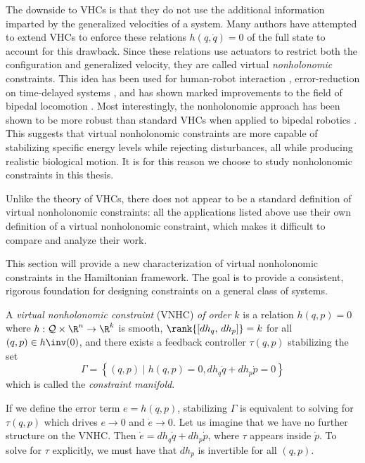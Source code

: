 The downside to VHCs is that they do not use the additional information imparted
by the generalized velocities of a system.
Many authors have attempted to extend VHCs to enforce these relations 
\(h(q,\dot{q}) = 0\) of the full state to account for this drawback. 
Since these relations use actuators to
restrict both the configuration and generalized velocity, they are called
virtual \textit{nonholonomic} constraints. This idea has been used for
human-robot interaction
\cite{vnhc_human_robot_cooperation,psd_based_vnhc_redundant_manipulator,haptic_vnhc},
error-reduction on time-delayed systems \cite{vnhc_time_delay_teleop},
and has shown marked improvements to the field of bipedal locomotion 
\cite{nhvc_dynamic_walking,
hybrid_zero_dynamics_bipedal_nhvcs,output_nhvc_bipedal_control}.
Most interestingly, the nonholonomic approach has been shown to be more robust
than standard VHCs when applied to bipedal robotics \cite{nhvc_incline_walking}.
This suggests that virtual nonholonomic constraints are more capable of
stabilizing specific energy levels while rejecting disturbances, all while
producing realistic biological motion. It is for this reason we choose to study
nonholonomic constraints in this thesis.

Unlike the theory of VHCs, there does not appear to be a standard definition of
virtual nonholonomic constraints: 
all the applications listed above use their own definition of a virtual
nonholonomic constraint, which makes it difficult to compare and analyze their
work. 

This section will provide a new characterization of virtual nonholonomic
constraints in the Hamiltonian framework. 
The goal is to provide a consistent, rigorous foundation for
designing constraints on a general class of systems.

\begin{defn}
    A \textit{virtual nonholonomic constraint} (VNHC) \textit{of order \(k\)} is a
    relation \(h(q,p) = 0\) where \(h : \mathcal{Q}\times\R^n \rightarrow \R^k\) is
    smooth, \(\rank{\left[ dh_q,\, dh_p \right]} = k\) for all 
    \((q,p) \in h\inv(0)\), and there exists a feedback controller \(\tau(q,p)\)
    stabilizing the set
    \[
        \Gamma = \left\{(q,p) \mid h(q,p) = 0, dh_q \dot{q} + dh_p \dot{p} = 0\right\}
    \]
    which is called the \textit{constraint manifold}.
\end{defn}

If we define the error term  \(e = h(q,p)\), stabilizing \(\Gamma\) is
equivalent to solving for \(\tau(q,p)\) which drives \(e \rightarrow 0\) and
\(\dot{e} \rightarrow 0\).
Let us imagine that we have no further structure on the VNHC. 
Then \(\dot{e} = dh_q \dot{q} + dh_p \dot{p}\), where \(\tau\) appears inside
\(\dot{p}\). To solve for \(\tau\) explicitly, we must have that \(dh_p\) is
invertible for all \((q,p)\).

